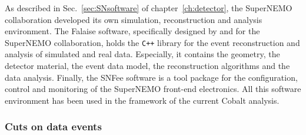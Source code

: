 As described in Sec.~\ref{sec:SNsoftware} of chapter~\ref{ch:detector}, the SuperNEMO collaboration developed its own simulation, reconstruction and analysis environment.
The Falaise software, specifically designed by and for the SuperNEMO collaboration, holds the \verb!C++! library for the event reconstruction and analysis of simulated and real data.
Especially, it contains the geometry, the detector material, the event data model, the reconstruction algorithms and the data analysis.
Finally, the SNFee software is a tool package for the configuration, control and monitoring of the SuperNEMO front-end electronics.
All this software environment has been used in the framework of the current Cobalt analysis.



\subsubsection{Cuts on data events}

